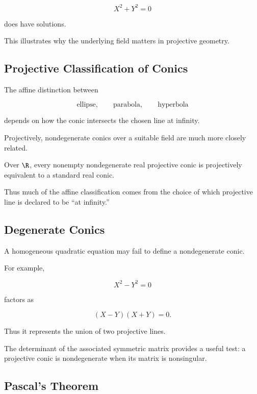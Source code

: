 \[
X^2+Y^2=0
\]

does have solutions.

This illustrates why the underlying field matters in projective geometry.

\subsection{Projective Classification of Conics}
\label{subsec:projective-classification-conics}

The affine distinction between

\[
\text{ellipse},
\qquad
\text{parabola},
\qquad
\text{hyperbola}
\]

depends on how the conic intersects the chosen line at infinity.

Projectively, nondegenerate conics over a suitable field are much more
closely related.

Over \(\R\), every nonempty nondegenerate real projective conic is
projectively equivalent to a standard real conic.

Thus much of the affine classification comes from the choice of which
projective line is declared to be ``at infinity.''

\subsection{Degenerate Conics}
\label{subsec:degenerate-projective-conics}

A homogeneous quadratic equation may fail to define a nondegenerate conic.

For example,

\[
X^2-Y^2=0
\]

factors as

\[
(X-Y)(X+Y)=0.
\]

Thus it represents the union of two projective lines.

The determinant of the associated symmetric matrix provides a useful test:
a projective conic is nondegenerate when its matrix is nonsingular.

\subsection{Pascal's Theorem}
\label{subsec:pascals-theorem}

